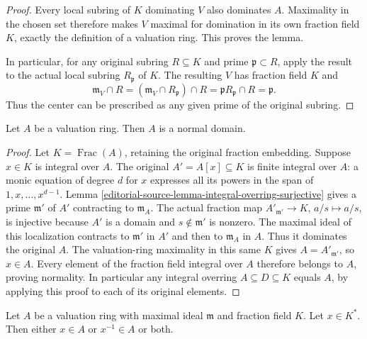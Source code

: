 \begin{proof}
Every local subring of $K$
dominating $V$ also dominates
$A$. Maximality in the chosen
set therefore makes $V$ maximal
for domination in its own
fraction field $K$, exactly
the definition of a valuation
ring. This proves the lemma.

In particular, for any original
subring $R\subseteq K$ and
prime $\mathfrak p\subset R$,
apply the result to the
actual local subring $R_{\mathfrak p}$
of $K$. The resulting $V$
has fraction field $K$ and
$$
\mathfrak m_V\cap R
=(\mathfrak m_V\cap R_{\mathfrak p})\cap R
=\mathfrak pR_{\mathfrak p}\cap R
=\mathfrak p.
$$
Thus the center can be
prescribed as any given
prime of the original subring.
\end{proof}

\begin{lemma}
\label{editorial-source-lemma-valuation-ring-normal}
Let $A$ be a valuation ring.
Then $A$ is a normal domain.
\end{lemma}

\begin{proof}
Let $K=\operatorname{Frac}(A)$, retaining
the original fraction embedding. Suppose
$x\in K$ is integral over $A$.
The original $A'=A[x]\subseteq K$
is finite integral over $A$: a
monic equation of degree $d$ for
$x$ expresses all its powers in
the span of $1,x,\ldots,x^{d-1}$.
Lemma \ref{editorial-source-lemma-integral-overring-surjective}
gives a prime $\mathfrak m'$ of
$A'$ contracting to $\mathfrak m_A$.
The actual fraction map
$A'_{\mathfrak m'}\to K$, $a/s\mapsto a/s$,
is injective because $A'$ is a
domain and $s\notin\mathfrak m'$
is nonzero. The maximal ideal
of this localization contracts to
$\mathfrak m'$ in $A'$ and then
to $\mathfrak m_A$ in $A$.
Thus it dominates the original
$A$. The valuation-ring maximality
in this same $K$ gives
$A=A'_{\mathfrak m'}$, so $x\in A$.
Every element of the fraction field
integral over $A$ therefore belongs
to $A$, proving normality.
In particular any integral overring
$A\subseteq D\subseteq K$ equals
$A$, by applying this proof to
each of its original elements.
\end{proof}


\begin{lemma}
\label{editorial-source-lemma-valuation-ring-x-or-x-inverse}
Let $A$ be a valuation ring with maximal ideal $\mathfrak m$ and
fraction field $K$.
Let $x \in K^*$. Then either $x \in A$ or $x^{-1} \in A$ or both.
\end{lemma}

